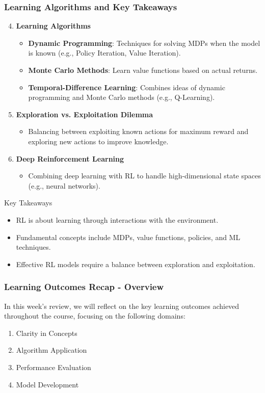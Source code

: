 \documentclass[aspectratio=169]{beamer}
\begin{document}
\begin{frame}[fragile]
    \frametitle{Learning Algorithms and Key Takeaways}
    \begin{enumerate}
        \setcounter{enumi}{3}
        \item \textbf{Learning Algorithms}
            \begin{itemize}
                \item \textbf{Dynamic Programming}: Techniques for solving MDPs when the model is known (e.g., Policy Iteration, Value Iteration).
                \item \textbf{Monte Carlo Methods}: Learn value functions based on actual returns.
                \item \textbf{Temporal-Difference Learning}: Combines ideas of dynamic programming and Monte Carlo methods (e.g., Q-Learning).
            \end{itemize}
        \item \textbf{Exploration vs. Exploitation Dilemma}
            \begin{itemize}
                \item Balancing between exploiting known actions for maximum reward and exploring new actions to improve knowledge.
            \end{itemize}
        \item \textbf{Deep Reinforcement Learning}
            \begin{itemize}
                \item Combining deep learning with RL to handle high-dimensional state spaces (e.g., neural networks).
            \end{itemize}
    \end{enumerate}
    \begin{block}{Key Takeaways}
        \begin{itemize}
            \item RL is about learning through interactions with the environment.
            \item Fundamental concepts include MDPs, value functions, policies, and ML techniques.
            \item Effective RL models require a balance between exploration and exploitation.
        \end{itemize}
    \end{block}
\end{frame}

\begin{frame}[fragile]
    \frametitle{Learning Outcomes Recap - Overview}
    In this week’s review, we will reflect on the key learning outcomes achieved throughout the course, focusing on the following domains:

    \begin{enumerate}
        \item Clarity in Concepts
        \item Algorithm Application
        \item Performance Evaluation
        \item Model Development
    \end{enumerate}
\end{frame}
\end{document}

